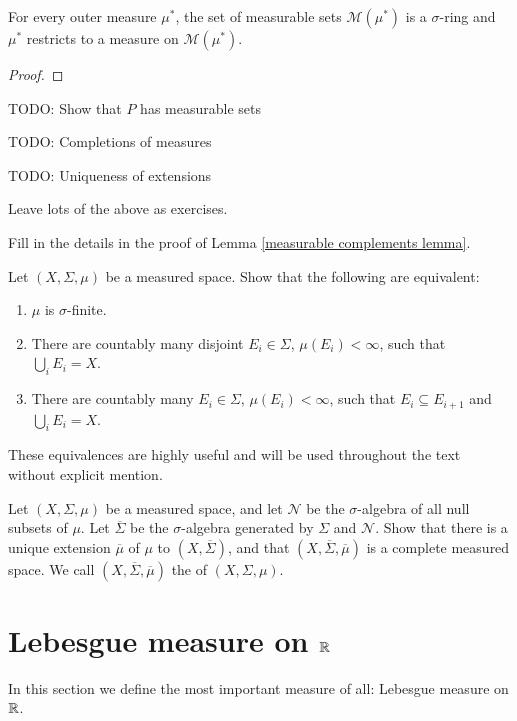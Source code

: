 \begin{lemma}
For every outer measure $\mu^*$, the set of measurable sets $\mathcal M(\mu^*)$ is a $\sigma$-ring and $\mu^*$ restricts to a measure on $\mathcal M(\mu^*)$.
\end{lemma}
\begin{proof}

\end{proof}



TODO: Show that $P$ has measurable sets

TODO: Completions of measures

TODO: Uniqueness of extensions

Leave lots of the above as exercises.

\begin{exercise}
\label{measurable complements}
Fill in the details in the proof of Lemma \ref{measurable complements lemma}.
\end{exercise}

\begin{exercise}
Let $(X, \Sigma, \mu)$ be a measured space. Show that the following are equivalent:
\begin{enumerate}
\item $\mu$ is $\sigma$-finite.
\item There are countably many disjoint $E_i \in \Sigma$, $\mu(E_i) < \infty$, such that $\bigcup_i E_i = X$.
\item There are countably many $E_i \in \Sigma$, $\mu(E_i) < \infty$, such that $E_i \subseteq E_{i+1}$ and $\bigcup_i E_i = X$.
\end{enumerate}
These equivalences are highly useful and will be used throughout the text without explicit mention.
\end{exercise}

\begin{exercise}
Let $(X, \Sigma, \mu)$ be a measured space, and let $\mathcal N$ be the $\sigma$-algebra of all null subsets of $\mu$. Let $\overline \Sigma$ be the $\sigma$-algebra generated by $\Sigma$ and $\mathcal N$.
Show that there is a unique extension $\overline \mu$ of $\mu$ to $(X, \overline \Sigma)$, and that $(X, \overline \Sigma, \overline \mu)$ is a complete measured space.
We call $(X, \overline \Sigma, \overline \mu)$ the  of $(X, \Sigma, \mu)$.
\end{exercise}

\section{Lebesgue measure on $\mathbb{R}$}
In this section we define the most important measure of all: Lebesgue measure on $\mathbb{R}$.

